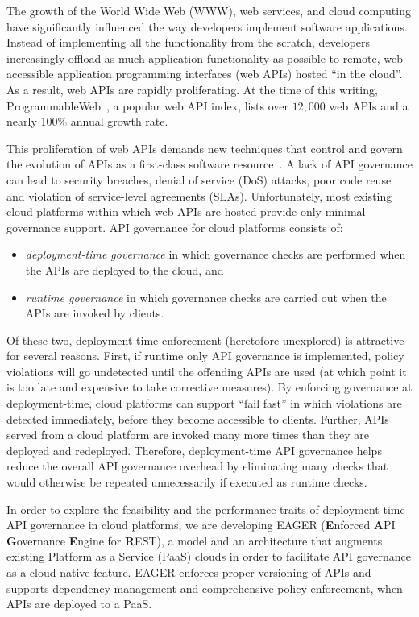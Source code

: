 The growth of the World Wide Web (WWW), web services, and cloud computing have
significantly influenced the way developers implement software applications.
Instead of implementing all the functionality from the scratch, developers
increasingly offload as much application functionality as possible to remote,
web-accessible application programming interfaces (web APIs) hosted ``in the
cloud''. As a result, web APIs are rapidly proliferating.
At the time of this writing, 
ProgrammableWeb~\cite{pweb}, a popular web API index, lists over $12,000$
web APIs and a nearly 100\% annual growth rate. 

This proliferation of web APIs demands new techniques that
control and govern the evolution of APIs as a first-class software
resource~\cite{6903538}. A lack of API governance can lead to 
security breaches, denial of service (DoS)
attacks, poor code reuse and violation of service-level agreements (SLAs). 
Unfortunately, most existing cloud platforms
within which web APIs are hosted provide only minimal governance support.
API governance for cloud platforms consists of:
\begin{itemize}
\item \textit{deployment-time governance} in which governance checks are performed 
when the APIs are deployed to the cloud, and
\item \textit{runtime governance} in which governance checks are carried out when the APIs
are invoked by clients.
\end{itemize}
Of these two, 
deployment-time enforcement (heretofore unexplored) is attractive for several
reasons.  First, if runtime only API governance is implemented, 
policy violations will go undetected until the offending APIs are used (at which
point it is too late and expensive to take corrective measures).  
By enforcing governance at deployment-time,
cloud platforms can support ``fail fast'' in which violations are detected
immediately, before they become accessible to clients. Further, APIs served from a cloud
platform are invoked many more times than they are deployed and redeployed. 
Therefore, deployment-time API governance helps reduce the overall API governance
overhead by eliminating many checks that would otherwise be repeated unnecessarily
if executed as runtime checks.

In order to explore the feasibility and the performance traits of deployment-time
API governance in cloud platforms,
we are developing EAGER ({\bf E}nforced {\bf A}PI {\bf G}overnance
{\bf E}ngine for {\bf R}EST), a model and an architecture that augments existing
Platform as a Service (PaaS) clouds in order to facilitate API governance as a 
cloud-native feature. EAGER enforces proper versioning of APIs and supports dependency 
management and comprehensive policy enforcement, when APIs are deployed to a PaaS.


